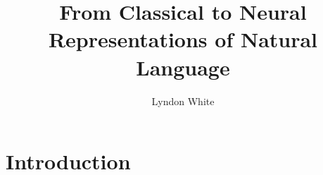 \documentclass{book}
\title{From Classical to Neural Representations of Natural Language}
\author{Lyndon White}
\begin{document}
\maketitle
\tableofcontents


\chapter{Introduction}







\end{document}
